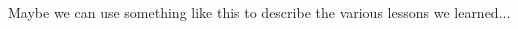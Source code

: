 \documentclass{article}
\begin{document}


\begin{framed}
 \\
Maybe we can use something like this to describe the various lessons we
learned...
\end{framed}



\begin{thebibliography}{1}


% 
% 
% 
% 
% 
% 
% 
% 
% 
% 
%  
% 
% 
% 

\end{thebibliography}
\end{document}
